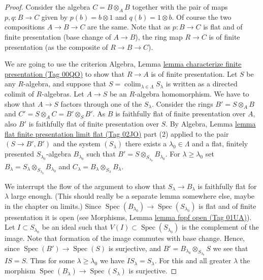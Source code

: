 \documentclass{amsart}
\theoremstyle{plain}
\theoremstyle{definition}
\theoremstyle{remark}
\numberwithin{equation}{subsection}
\def\colim{\mathop{\mathrm{colim}}\nolimits}
\def\Spec{\mathop{\mathrm{Spec}}}
\begin{document}
\begin{proof}
Consider the algebra $C = B \otimes_A B$ together with the
pair of maps $p, q : B \to C$ given by $p(b) = b \otimes 1$
and $q(b) = 1 \otimes b$. Of course the two compositions
$A \to B \to C$ are the same. Note that as
$p : B \to C$ is flat and of finite presentation (base change of
$A \to B$), the ring map $R \to C$ is of finite presentation
(as the composite of $R \to B \to C$).

\medskip\noindent
We are going to use the criterion
Algebra, Lemma \href{https://stacks.math.columbia.edu/tag/00QO}{lemma characterize finite presentation (Tag 00QO)}
to show that $R \to A$ is of finite presentation.
Let $S$ be any $R$-algebra, and suppose that
$S = \colim_{\lambda \in \Lambda} S_\lambda$ is written
as a directed colimit of $R$-algebras.
Let $A \to S$ be an $R$-algebra homomorphism. We have to
show that $A \to S$ factors through one of the $S_\lambda$.
Consider the rings $B' = S \otimes_A B$ and
$C' = S \otimes_A C = B' \otimes_S B'$.
As $B$ is faithfully flat of finite presentation over $A$, also $B'$
is faithfully flat of finite presentation over $S$.
By Algebra, Lemma \href{https://stacks.math.columbia.edu/tag/02JO}{lemma flat finite presentation limit flat (Tag 02JO)}
part (2) applied to the pair $(S \to B', B')$ and the system $(S_\lambda)$
there exists a $\lambda_0 \in \Lambda$
and a flat, finitely presented $S_{\lambda_0}$-algebra
$B_{\lambda_0}$ such that $B' = S \otimes_{S_{\lambda_0}} B_{\lambda_0}$.
For $\lambda \geq \lambda_0$ set
$B_\lambda = S_\lambda \otimes_{S_{\lambda_0}} B_{\lambda_0}$ and
$C_\lambda = B_\lambda \otimes_{S_\lambda} B_\lambda$.

\medskip\noindent
We interrupt the flow of the argument to show that $S_\lambda \to B_\lambda$
is faithfully flat for $\lambda$ large enough. (This should really
be a separate lemma somewhere else, maybe in the chapter on limits.)
Since $\Spec(B_{\lambda_0}) \to \Spec(S_{\lambda_0})$ is
flat and of finite presentation it is open (see Morphisms,
Lemma \href{https://stacks.math.columbia.edu/tag/01UA}{lemma fppf open (Tag 01UA)}).
Let $I \subset S_{\lambda_0}$ be an ideal such that
$V(I) \subset \Spec(S_{\lambda_0})$ is the complement
of the image. Note that formation of the image commutes
with base change. Hence, since $\Spec(B') \to \Spec(S)$
is surjective, and $B' = B_{\lambda_0} \otimes_{S_{\lambda_0}} S$
we see that $IS = S$. Thus for some $\lambda \geq \lambda_0$ we
have $IS_{\lambda} = S_\lambda$. For this and all greater
$\lambda$ the morphism
$\Spec(B_\lambda) \to \Spec(S_\lambda)$ is surjective.


\end{proof}
\end{document}
